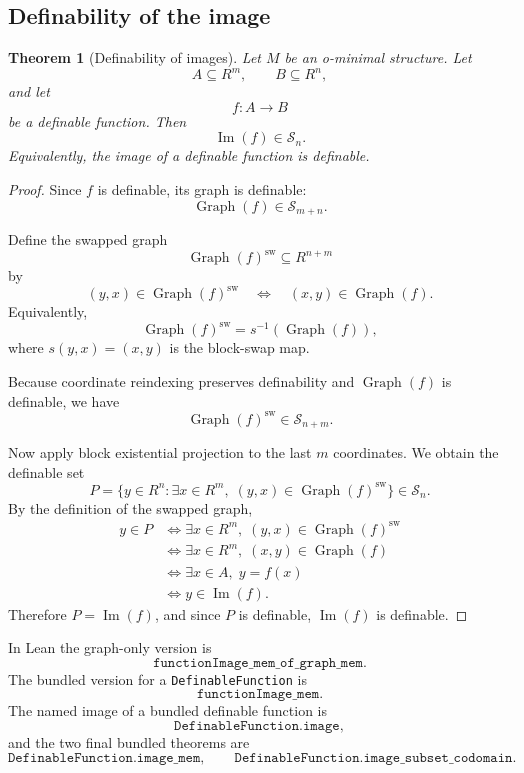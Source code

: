 \documentclass[11pt]{article}
\newtheorem{theorem}[definition]{Theorem}
\newcommand{\Sfam}{\mathcal S}
\newcommand{\Graph}{\operatorname{Graph}}
\newcommand{\Imf}{\operatorname{Im}}
\newcommand{\Lean}[1]{\texttt{#1}}
\begin{document}
\subsection{Definability of the image}

\begin{theorem}[Definability of images]
Let $M$ be an o-minimal structure.  Let
\[
  A\subseteq R^m,
  \qquad
  B\subseteq R^n,
\]
and let
\[
  f:A\to B
\]
be a definable function.  Then
\[
  \Imf(f)\in\Sfam_n.
\]
Equivalently, the image of a definable function is definable.
\end{theorem}

\begin{proof}
Since $f$ is definable, its graph is definable:
\[
  \Graph(f)
  \in
  \Sfam_{m+n}.
\]

Define the swapped graph
\[
  \Graph(f)^{\mathrm{sw}}
  \subseteq
  R^{n+m}
\]
by
\[
  (y,x)
  \in
  \Graph(f)^{\mathrm{sw}}
  \quad\Longleftrightarrow\quad
  (x,y)
  \in
  \Graph(f).
\]
Equivalently,
\[
  \Graph(f)^{\mathrm{sw}}
  =s^{-1}(\Graph(f)),
\]
where $s(y,x)=(x,y)$ is the block-swap map.

Because coordinate reindexing preserves definability and $\Graph(f)$ is definable, we have
\[
  \Graph(f)^{\mathrm{sw}}
  \in
  \Sfam_{n+m}.
\]

Now apply block existential projection to the last $m$ coordinates.  We obtain the definable set
\[
  P
  =
  \{y\in R^n:\exists x\in R^m,
  \;(y,x)
  \in
  \Graph(f)^{\mathrm{sw}}
  \}
  \in
  \Sfam_n.
\]
By the definition of the swapped graph,
\[
\begin{aligned}
  y\in P
  &\Longleftrightarrow
  \exists x\in R^m,
  \;(y,x)
  \in
  \Graph(f)^{\mathrm{sw}} \\
  &\Longleftrightarrow
  \exists x\in R^m,
  \;(x,y)
  \in
  \Graph(f) \\
  &\Longleftrightarrow
  \exists x\in A,
  \;y=f(x) \\
  &\Longleftrightarrow
  y\in\Imf(f).
\end{aligned}
\]
Therefore $P=\Imf(f)$, and since $P$ is definable, $\Imf(f)$ is definable.
\end{proof}

In Lean the graph-only version is
\[
  \Lean{functionImage\_mem\_of\_graph\_mem}.
\]
The bundled version for a \Lean{DefinableFunction} is
\[
  \Lean{functionImage\_mem}.
\]
The named image of a bundled definable function is
\[
  \Lean{DefinableFunction.image},
\]
and the two final bundled theorems are
\[
  \Lean{DefinableFunction.image\_mem},
  \qquad
  \Lean{DefinableFunction.image\_subset\_codomain}.
\]
\end{document}
